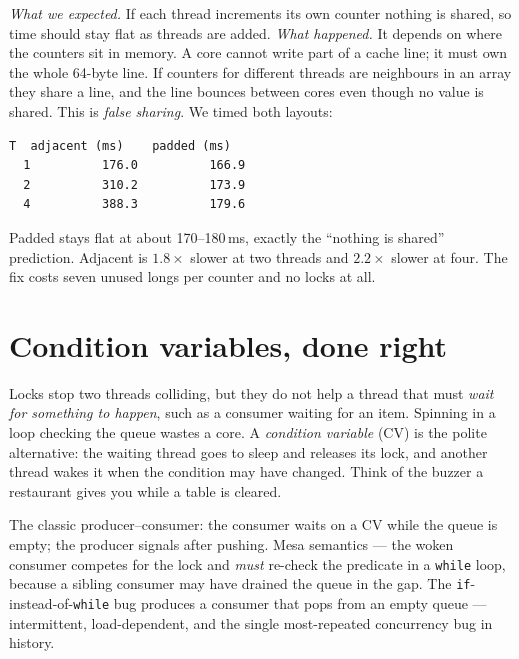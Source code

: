 \begin{example}
\emph{What we expected.} If each thread increments its own counter
nothing is shared, so time should stay flat as threads are added.
\emph{What happened.} It depends on where the counters sit in memory.
A core cannot write part of a cache line; it must own the whole
64-byte line. If counters for different threads are neighbours in an
array they share a line, and the line bounces between cores even
though no value is shared. This is \emph{false sharing}. We timed both
layouts:

\begin{lstlisting}[basicstyle=\ttfamily\scriptsize,caption={Real output of
\texttt{ch13\_partition} (Linux x86\_64 container; 100 million
increments per thread). ``padded'' puts each counter on its own
64-byte line.}]
  T  adjacent (ms)    padded (ms)
  1          176.0          166.9
  2          310.2          173.9
  4          388.3          179.6
\end{lstlisting}

Padded stays flat at about 170--180\,ms, exactly the ``nothing is
shared'' prediction. Adjacent is $1.8\times$ slower at two threads and
$2.2\times$ slower at four. The fix costs seven unused longs per
counter and no locks at all.
\end{example}

\section{Condition variables, done right}
\label{sec:cv13}



Locks stop two threads colliding, but they do not help a thread
that must \emph{wait for something to happen}, such as a consumer
waiting for an item. Spinning in a loop checking the queue wastes a
core. A \emph{condition variable} (CV) is the polite alternative: the
waiting thread goes to sleep and releases its lock, and another
thread wakes it when the condition may have changed. Think of the
buzzer a restaurant gives you while a table is cleared.

The classic producer--consumer: the consumer waits on a CV while
the queue is empty; the producer signals after pushing. Mesa
semantics --- the woken consumer competes for the lock and
\emph{must} re-check the predicate in a \texttt{while} loop, because
a sibling consumer may have drained the queue in the gap. The
\texttt{if}-instead-of-\texttt{while} bug produces a consumer that
pops from an empty queue --- intermittent, load-dependent, and the
single most-repeated concurrency bug in history.


